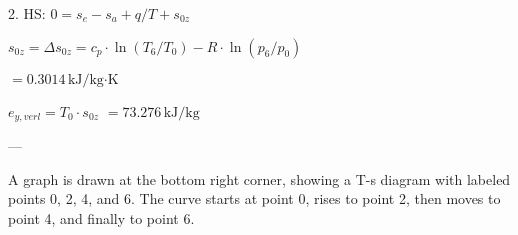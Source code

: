 2. HS: \( 0 = s_e - s_a + q / T + s_{0z} \)  

\( s_{0z} = \Delta s_{0z} = c_p \cdot \ln(T_6 / T_0) - R \cdot \ln(p_6 / p_0) \)  

\( = 0.3014 \, \text{kJ/kg·K} \)  

\( e_{y,verl} = T_0 \cdot s_{0z} \)  
\( = 73.276 \, \text{kJ/kg} \)  

---

A graph is drawn at the bottom right corner, showing a T-s diagram with labeled points 0, 2, 4, and 6. The curve starts at point 0, rises to point 2, then moves to point 4, and finally to point 6.